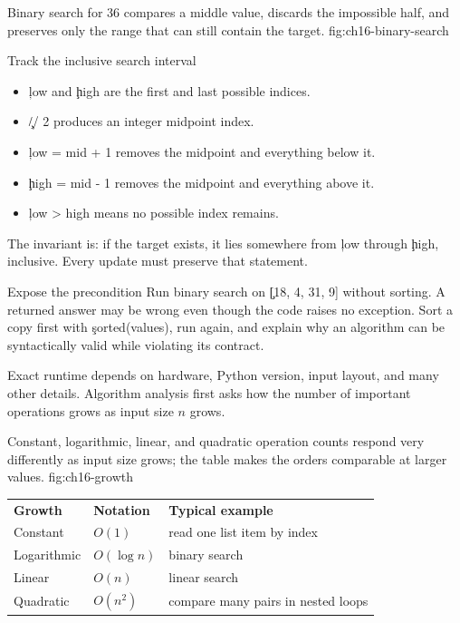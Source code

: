 {Binary search for 36 compares a middle value, discards the impossible half, and preserves only the range that can still contain the target.}
{fig:ch16-binary-search}

\begin{SyntaxBox}{Track the inclusive search interval}
\begin{itemize}
    \item \c{low} and \c{high} are the first and last possible indices.
    \item \c{// 2} produces an integer midpoint index.
    \item \c{low = mid + 1} removes the midpoint and everything below it.
    \item \c{high = mid - 1} removes the midpoint and everything above it.
    \item \c{low > high} means no possible index remains.
\end{itemize}
The invariant is: if the target exists, it lies somewhere from \c{low} through
\c{high}, inclusive. Every update must preserve that statement.
\end{SyntaxBox}

\begin{TryBox}{Expose the precondition}
Run binary search on \c{[18, 4, 31, 9]} without sorting. A returned answer may
be wrong even though the code raises no exception. Sort a copy first with
\c{sorted(values)}, run again, and explain why an algorithm can be syntactically
valid while violating its contract.
\end{TryBox}


Exact runtime depends on hardware, Python version, input layout, and many other
details. Algorithm analysis first asks how the number of important operations
grows as input size $n$ grows.

{Constant, logarithmic, linear, and quadratic operation counts respond very differently as input size grows; the table makes the orders comparable at larger values.}
{fig:ch16-growth}

\begin{center}
\begin{tabular}{lll}
\textbf{Growth} & \textbf{Notation} & \textbf{Typical example} \\
Constant & $O(1)$ & read one list item by index \\
Logarithmic & $O(\log n)$ & binary search \\
Linear & $O(n)$ & linear search \\
Quadratic & $O(n^2)$ & compare many pairs in nested loops \\
\end{tabular}
\end{center}

